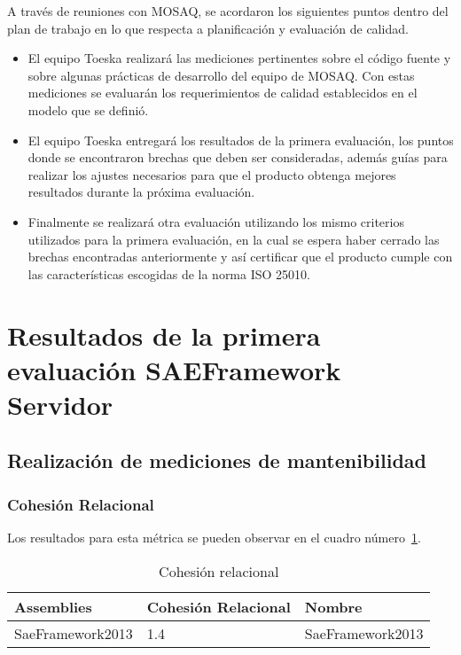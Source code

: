 A través de reuniones con MOSAQ, se acordaron los siguientes puntos dentro del plan de trabajo en lo 
que respecta a planificación y evaluación de calidad.
\begin{itemize}
\item El equipo Toeska realizará las mediciones pertinentes sobre el código fuente y sobre algunas 
prácticas de desarrollo del equipo de MOSAQ. Con estas mediciones se evaluarán los requerimientos de 
calidad establecidos en el modelo que se definió.

\item El equipo Toeska entregará los resultados de la primera evaluación, los puntos donde se encontraron 
brechas que deben ser consideradas, además guías para realizar los ajustes necesarios para que el producto 
obtenga mejores resultados durante la próxima evaluación.

\item Finalmente se realizará otra evaluación utilizando los mismo criterios utilizados 
para la primera evaluación, en la cual se espera haber cerrado las brechas encontradas anteriormente 
y así certificar que el producto cumple con las características escogidas de la norma ISO 25010.
\end{itemize}

\section{Resultados de la primera evaluación SAEFramework Servidor}
\subsection{Realización de mediciones de mantenibilidad}

\subsubsection{Cohesión Relacional}

Los resultados para esta métrica se pueden observar en el cuadro número~\ref{table:CR}.

\begin{table}[hb]
\centering
    \begin{tabular}{|l|l|l|}
    \hline
       \bf{Assemblies}       & \bf{Cohesión Relacional} & \bf{Nombre}           \\ \hline
       SaeFramework2013 & 1.4                   & SaeFramework2013 \\ \hline
    \end{tabular}
    \caption{Cohesión relacional}
    \label{table:CR}
\end{table}

